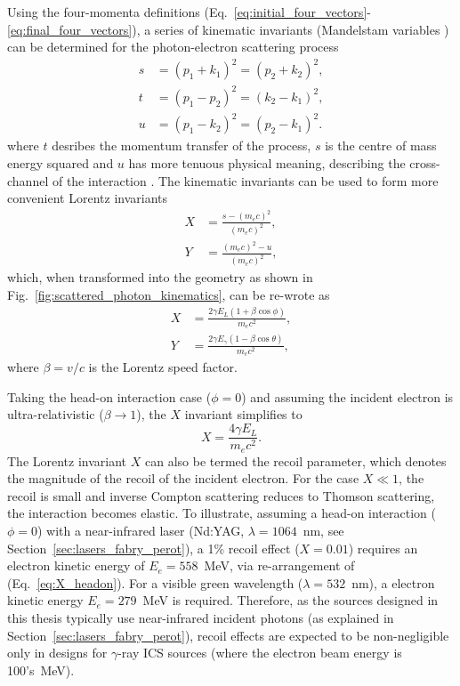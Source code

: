 \documentclass[../main.tex]{subfiles}
\begin{document}
Using the four-momenta definitions (Eq.~\ref{eq:initial_four_vectors}-\ref{eq:final_four_vectors}), a  series of kinematic invariants (Mandelstam variables \cite{mandelstam1958determination}) can be determined for the photon-electron scattering process \cite{berestetskii1982quantum}
\begin{align}
s &= \left(p_{1}+k_{1}\right)^{2} = \left(p_{2}+k_{2}\right)^{2},
\label{eq:s_Mandelstam} \\
t &= \left(p_{1}-p_{2}\right)^{2} = \left(k_{2}-k_{1}\right)^{2},
\label{eq:t_Mandelstam} \\
u &= \left(p_{1}-k_{2}\right)^{2} = \left(p_{2}-k_{1}\right)^{2}.
\label{eq:u_Mandelstam}
\end{align}
where $t$ desribes the momentum transfer of the process, $s$ is the centre of mass energy squared and $u$ has more tenuous physical meaning, describing the cross-channel of the interaction \cite{berestetskii1982quantum}. The kinematic invariants can be used to form more convenient Lorentz invariants
\begin{align}
X &= \frac{s-\left(m_{e}c\right)^{2}}{\left(m_{e}c\right)^{2}},
\label{eq:X_Mandelstam} \\
Y &= \frac{\left(m_{e}c\right)^{2}-u}{\left(m_{e}c\right)^{2}},
\label{eq:Y_Mandelstam}
\end{align}
which, when transformed into the geometry as shown in Fig.~\ref{fig:scattered_photon_kinematics}, can be re-wrote as
\begin{align}
X &= \frac{2\gamma E_{L}\left(1+\beta\cos\phi\right)}{m_{e}c^{2}},
\label{eq:X_geometry} \\
Y &= \frac{2\gamma E_{\gamma}\left(1-\beta\cos\theta\right)}{m_{e}c^{2}},
\label{eq:Y_geometry}
\end{align}
where $\beta = v/c$ is the Lorentz speed factor.

Taking the head-on interaction case ($\phi = 0$) and assuming the incident electron is ultra-relativistic ($\beta \rightarrow 1$), the $X$ invariant simplifies to 
\begin{equation}
X = \frac{4\gamma E_{L}}{m_{e}c^{2}}.
\label{eq:X_headon}
\end{equation}
The Lorentz invariant $X$ can also be termed the recoil parameter, which denotes the magnitude of the recoil of the incident electron. For the case $X \ll 1$, the recoil is small and inverse Compton scattering reduces to Thomson scattering, the interaction becomes elastic. To illustrate, assuming a head-on interaction ($\phi=0$) with a near-infrared laser (Nd:YAG, $\lambda = 1064$~\si{\nano\meter}, see Section~\ref{sec:lasers_fabry_perot}), a 1\% recoil effect ($X = 0.01$) requires an electron kinetic energy of $E_{e} = 558$~\si{\mega\electronvolt}, via re-arrangement of (Eq.~\ref{eq:X_headon}). For a visible green wavelength ($\lambda = 532$~\si{\nano\meter}), a electron kinetic energy $E_{e} = 279$~\si{\mega\electronvolt} is required. Therefore, as the sources designed in this thesis typically use near-infrared incident photons (as explained in Section~\ref{sec:lasers_fabry_perot}), recoil effects are expected to be non-negligible only in designs for $\gamma$-ray ICS sources (where the electron beam energy is 100's~\si{\mega\electronvolt}).   
\end{document}
